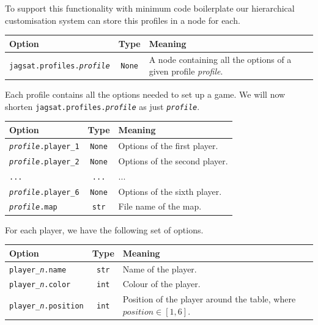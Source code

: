 \documentclass[12pt,a4paper]{article}
\begin{document}
To support this functionality with minimum code boilerplate our
hierarchical customisation system can store this profiles in a node
for each.

\begin{table}[h]
  \centering
  \begin{tabular}[h]{l|c|p{5.5cm}}
    Option & Type & Meaning \\ \hline\hline
    
    \texttt{jagsat.profiles.\emph{profile}} & \texttt{None} & A
    node containing all the options of a given profile \emph{profile}.
  \end{tabular}
\end{table}

Each profile contains all the options needed to set up a game. We will
now shorten \texttt{jagsat.profiles.\emph{profile}} as just
\texttt{\emph{profile}}.

\begin{table}[h]
  \centering
  \begin{tabular}[h]{l|c|p{7cm}}
    Option & Type & Meaning \\ \hline\hline
    
    \texttt{\emph{profile}.player\_1} & \texttt{None} & Options of the
    first player. \\
    \texttt{\emph{profile}.player\_2} & \texttt{None} & Options of the
    second player. \\
    \texttt{...} & \texttt{...} & ... \\
    \texttt{\emph{profile}.player\_6} & \texttt{None} & Options of the
    sixth player. \\
    \texttt{\emph{profile}.map} & \texttt{str} & File name of the map. \\
  \end{tabular}
\end{table}

For each player, we have the following set of options.

\begin{table}[h]
  \centering
  \begin{tabular}[h]{l|c|p{7cm}}
    Option & Type & Meaning \\ \hline\hline
    
    \texttt{player\_\emph{n}.name} & \texttt{str} & Name of the
    player. \\
    \texttt{player\_\emph{n}.color} & \texttt{int} & Colour of the player. \\
    \texttt{player\_\emph{n}.position} & \texttt{int} & Position of
    the player around the table, where $position \in [1, 6]$. \\
  \end{tabular}
\end{table}
\end{document}
